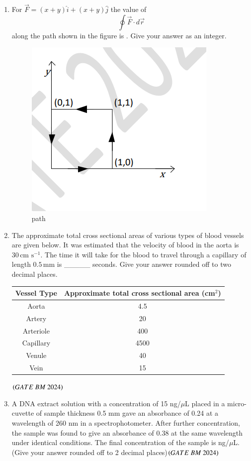 \documentclass[journal,12pt,onecolumn]{IEEEtran}
\theoremstyle{remark}
\begin{document}
\begin{enumerate}
\item For $\vec{F} = (x+y)\hat{i} + (x+y)\hat{j}$ the value of 
\[
\oint \vec{F} \cdot d\vec{r}
\]
along the path shown in the figure is  \underline{\hspace{2cm}}. Give your answer as an integer.
\begin{figure}[H]
\centering
\includegraphics[width=0.4\columnwidth]{Figs/Fig 12.png}
\caption{path}
\label{fig:placeholder}
\end{figure}

\item The approximate total cross sectional areas of various types of blood vessels are given below. It was estimated that the velocity of blood in the aorta is $30 \,\text{cm s}^{-1}$. The time it will take for the blood to travel through a capillary of length $0.5 \,\text{mm}$ is \_\_\_\_\_ seconds. Give your answer rounded off to two decimal places.

\bigskip

\begin{center}
\begin{tabular}{|c|c|}
\hline
\textbf{Vessel Type} & \textbf{Approximate total cross sectional area (cm$^2$)} \\
\hline
Aorta      & 4.5  \\
\hline
Artery     & 20   \\
\hline
Arteriole  & 400  \\
\hline
Capillary  & 4500 \\
\hline
Venule     & 40   \\
\hline
Vein       & 15   \\
\hline
\end{tabular}
\end{center}
\hfill $\brak{GATE\ BM\ 2024}$


\item A DNA extract solution with a concentration of 15 ng/$\mu$L placed in a micro-cuvette of
sample thickness 0.5 mm gave an absorbance of 0.24 at a wavelength of 260 nm in a
spectrophotometer. After further concentration, the sample was found to give an
absorbance of 0.38 at the same wavelength under identical conditions. The final
concentration of the sample is \underline{\hspace{2cm}}ng/$\mu$L. (Give your answer rounded off to 2 decimal places)\hfill $\brak{GATE\ BM\ 2024}$


\end{enumerate}
\end{document}
